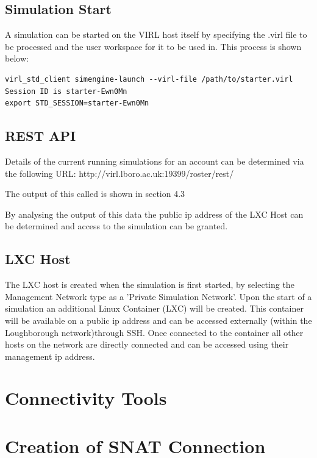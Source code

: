 \documentclass[11pt]{report}
\begin{document}
\subsection*{Simulation Start}

A simulation can be started on the VIRL host itself by specifying the .virl file to be processed and the user workspace for it to be used in. This process is shown below:

\begin{lstlisting}
virl_std_client simengine-launch --virl-file /path/to/starter.virl
Session ID is starter-Ewn0Mn
export STD_SESSION=starter-Ewn0Mn
\end{lstlisting}

\subsection*{REST API}

Details of the current running simulations for an account can be determined via the following URL: http://virl.lboro.ac.uk:19399/roster/rest/

The output of this called is shown in section 4.3

By analysing the output of this data the public ip address of the LXC Host can be determined and access to the simulation can be granted.

\subsection*{LXC Host}

The LXC host is created when the simulation is first started, by selecting the Management Network type as a 'Private Simulation Network'. Upon the start of a simulation an additional Linux Container (LXC) will be created. This container will be available on a public ip address and can be accessed externally (within the Loughborough network)through SSH. Once connected to the container all other hosts on the network are directly connected and can be accessed using their management ip address.

\section*{Connectivity Tools}

\section*{Creation of SNAT Connection}
\end{document}
